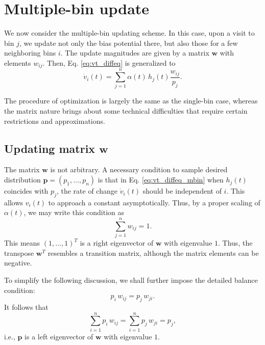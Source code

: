 \documentclass[reprint]{revtex4-1}
\begin{document}
\section{\label{sec:multiple-bin}
Multiple-bin update}



We now consider the multiple-bin updating scheme.
%
In this case,
upon a visit to bin $j$,
we update not only the bias potential there,
but also those for a few neighboring bins $i$.
%
The update magnitudes are given by a matrix $\mathbf w$
with elements $w_{ij}$.
%
Then, Eq. \eqref{eq:vt_diffeq} is generalized to
\begin{equation}
  \dot v_i(t) =
  \sum_{j=1}^n \alpha(t) \, h_j(t) \frac{ w_{ij} } { p_j }.
  \label{eq:vt_diffeq_mbin}
\end{equation}


The procedure of optimization is largely
the same as the single-bin case,
whereas the matrix nature brings about
some technical difficulties that require
certain restrictions and approximations.



\subsection{Updating matrix $\mathbf w$}



The matrix $\mathbf w$ is not arbitrary.
%
A necessary condition to sample desired distribution
$\mathbf p = (p_1, \dots, p_n)$
is that in Eq. \eqref{eq:vt_diffeq_mbin}
when $h_j(t)$ coincides with $p_j$,
the rate of change $\dot v_i(t)$
should be independent of $i$.
%
This allows $v_i(t)$ to approach a constant
asymptotically.
%
Thus, by a proper scaling of $\alpha(t)$,
we may write this condition as
%
\begin{equation}
  \sum_{j = 1}^n w_{ij} = 1.
  \label{eq:w_sumj}
\end{equation}
%
This means $(1, \dots, 1)^T$
is a right eigenvector of $\mathbf w$
with eigenvalue $1$.
%
Thus, the transpose $\mathbf w^T$
resembles a transition matrix,
although the matrix elements can be negative.



To simplify the following discussion,
we shall further impose the
detailed balance condition:
%
\begin{equation}
  p_i \, w_{ij} = p_j \, w_{ji}.
  \label{eq:w_detailedbalance}
\end{equation}
%
It follows that
\begin{equation}
  \sum_{i = 1}^n p_i \, w_{ij}
  =
  \sum_{i = 1}^n p_j \, w_{ji}
  = p_j,
  \label{eq:w_balance}
\end{equation}
%
i.e., $\mathbf p$ is a left eigenvector of
$\mathbf w$ with eigenvalue $1$.
\end{document}
